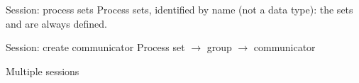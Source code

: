 \begin{numberedframe}{Session: process sets}
  Process sets, identified by name (not a data type):
  the sets  and  are always defined.
\end{numberedframe}

\begin{numberedframe}{Session: create communicator}
  Process set $\rightarrow$ group $\rightarrow$ communicator
\end{numberedframe}

\begin{numberedframe}{Multiple sessions}
\end{numberedframe}

\endinput

\begin{numberedframe}{}
\begin{lstlisting}
\end{lstlisting}
\end{numberedframe}

\begin{numberedframe}{}
\begin{lstlisting}
\end{lstlisting}
\end{numberedframe}

\begin{numberedframe}{}
\begin{lstlisting}
\end{lstlisting}
\end{numberedframe}

\begin{numberedframe}{}
\begin{lstlisting}
\end{lstlisting}
\end{numberedframe}

\endinput

\begin{numberedframe}{}
\begin{lstlisting}
\end{lstlisting}
\end{numberedframe}


